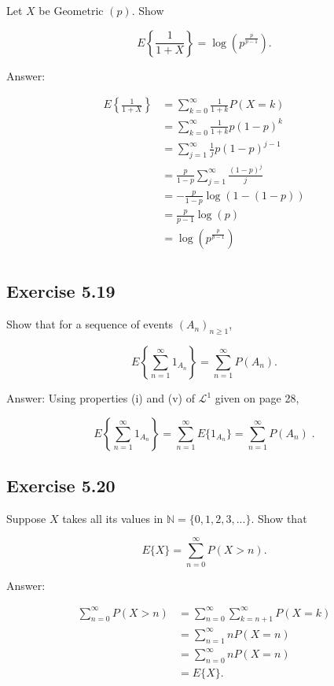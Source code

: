 \documentclass{article}
\begin{document}
Let $X$ be Geometric $(p)$. Show 

$$
E\left\lbrace\frac{1}{1+X}\right\rbrace = \log\left(p^{\frac{p}{p-1}}\right).
$$

Answer:

\begin{align*}
E\left\lbrace\frac{1}{1+X}\right\rbrace
&= \sum_{k = 0}^\infty \frac{1}{1+k} P\left(X = k \right) \\
&= \sum_{k=0}^\infty \frac{1}{1+k} p(1-p)^k \\
&= \sum_{j=1}^\infty \frac{1}{j}p(1-p)^{j-1} \\
&= \frac{p}{1-p}\sum_{j=1}^\infty \frac{(1-p)^j}{j} \\
&= -\frac{p}{1-p}\log(1 - (1-p)) \\
&= \frac{p}{p-1}\log(p) \\
&= \log \left(p^{\frac{p}{p-1}}\right) \\
\end{align*}





\subsection*{Exercise 5.19}

Show that for a sequence of events $(A_n)_{n\geq 1}$, 

$$
E\left\lbrace \sum_{n=1}^\infty 1_{A_n} \right\rbrace
= \sum_{n=1}^\infty P(A_n) .
$$

Answer: Using properties (i) and (v) of $\mathcal{L}^1$ given on page 28,

$$
E\left\lbrace \sum_{n=1}^\infty 1_{A_n} \right\rbrace
= \sum_{n=1}^\infty E\{1_{A_n} \}
= \sum_{n=1}^\infty P(A_n) \;.
$$

\subsection*{Exercise 5.20}

Suppose $X$ takes all its values in $\mathbb{N} = \{0, 1, 2, 3,...\}$. Show that

$$
E\{X\} = \sum_{n=0}^\infty P(X > n).
$$

Answer:

\begin{align*}
\sum_{n=0}^\infty P(X > n) &= \sum_{n=0}^\infty \sum_{k = n+1}^\infty P(X = k) \\
&= \sum_{n=1}^\infty nP(X = n) \\
&= \sum_{n=0}^\infty nP(X = n) \\
&= E\{X\}.
\end{align*}
\end{document}

